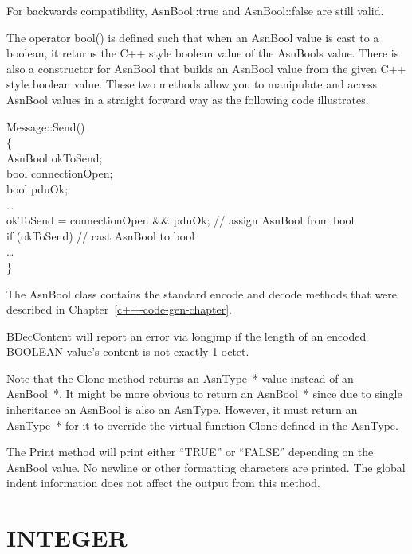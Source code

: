For backwards compatibility, {\C AsnBool::true} and {\C AsnBool::false} are still valid.

The {\C operator bool()} is defined such that when an {\C AsnBool}
value is cast to a boolean, it returns the C++ style boolean
value of the {\C AsnBool}s value.  There is also a constructor for {\C AsnBool}
that builds an {\C AsnBool} value from the given C++ style boolean
value. These two methods allow you to manipulate and access
{\C AsnBool} values in a straight forward way as the following code
illustrates.
\begin{Ccode}
Message::Send()\\
\{\+\\
  AsnBool	\>\>okToSend;\\
  bool		\>\>connectionOpen;\\
  bool		\>\>pduOk;\\
  \dots\\
  okToSend = connectionOpen \&\& pduOk; // assign AsnBool from bool\\
  if (okToSend) // cast AsnBool to bool\\
    \>\dots\\
\<\}
\end{Ccode}

The {\C AsnBool} class contains the standard encode and decode
methods that were described in Chapter~\ref{c++-code-gen-chapter}.

{\C BDecContent} will report an error via {\C longjmp} if the
length of an encoded BOOLEAN value's content is not exactly 1 octet.

Note that the {\C Clone} method returns an {\C AsnType~*} value
instead of an {\C AsnBool~*}.  It might be more obvious to return an
{\C AsnBool~*} since due to single inheritance an {\C AsnBool} is also
an {\C AsnType}.  However, it must return an {\C AsnType~*} for it
to override the virtual function {\C Clone} defined in the
{\C AsnType}.

The {\C Print} method will print either ``TRUE'' or ``FALSE''
depending on the {\C AsnBool} value.  No newline or other formatting
characters are printed.  The global indent information does not affect
the output from this method.


\section{\label{int-C++-section}INTEGER}

